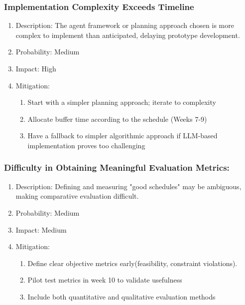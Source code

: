 \documentclass[12pt]{article}
\begin{document}
\subsubsection{Implementation Complexity Exceeds Timeline}
\begin{enumerate}
    \item Description: The agent framework or planning approach chosen is more complex to implement than anticipated, delaying prototype development.
    \item Probability: Medium
    \item Impact: High
    \item Mitigation: 
  \begin{enumerate}
      \item Start with a simpler planning approach; iterate to complexity
    \item Allocate buffer time according to the schedule (Weeks 7-9)
    \item Have a fallback to simpler algorithmic approach if LLM-based implementation proves too challenging
    \end{enumerate}
\end{enumerate}
\subsubsection{Difficulty in Obtaining Meaningful Evaluation Metrics:}
\begin{enumerate}
    \item Description: Defining and measuring "good schedules" may be ambiguous, making comparative evaluation difficult.
    \item Probability: Medium
    \item Impact: Medium
    \item Mitigation: 
  \begin{enumerate}
      \item Define clear objective metrics early(feasibility, constraint violations).
    \item Pilot test metrics in week 10 to validate usefulness
    \item Include both quantitative and qualitative evaluation methods
    \end{enumerate}
\end{enumerate}
\end{document}
